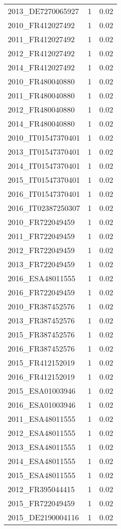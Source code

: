 \begin{table*}[htbp]
\begin{tabular}{lrr}
2013_DE7270065927 & 1 & 0.02 \\
2010_FR412027492 & 1 & 0.02 \\
2011_FR412027492 & 1 & 0.02 \\
2012_FR412027492 & 1 & 0.02 \\
2014_FR412027492 & 1 & 0.02 \\
2010_FR480040880 & 1 & 0.02 \\
2011_FR480040880 & 1 & 0.02 \\
2012_FR480040880 & 1 & 0.02 \\
2014_FR480040880 & 1 & 0.02 \\
2010_IT01547370401 & 1 & 0.02 \\
2013_IT01547370401 & 1 & 0.02 \\
2014_IT01547370401 & 1 & 0.02 \\
2015_IT01547370401 & 1 & 0.02 \\
2016_IT01547370401 & 1 & 0.02 \\
2016_IT02387250307 & 1 & 0.02 \\
2010_FR722049459 & 1 & 0.02 \\
2011_FR722049459 & 1 & 0.02 \\
2012_FR722049459 & 1 & 0.02 \\
2013_FR722049459 & 1 & 0.02 \\
2016_ESA48011555 & 1 & 0.02 \\
2016_FR722049459 & 1 & 0.02 \\
2010_FR387452576 & 1 & 0.02 \\
2013_FR387452576 & 1 & 0.02 \\
2015_FR387452576 & 1 & 0.02 \\
2016_FR387452576 & 1 & 0.02 \\
2015_FR412152019 & 1 & 0.02 \\
2016_FR412152019 & 1 & 0.02 \\
2015_ESA01003946 & 1 & 0.02 \\
2016_ESA01003946 & 1 & 0.02 \\
2011_ESA48011555 & 1 & 0.02 \\
2012_ESA48011555 & 1 & 0.02 \\
2013_ESA48011555 & 1 & 0.02 \\
2014_ESA48011555 & 1 & 0.02 \\
2015_ESA48011555 & 1 & 0.02 \\
2012_FR395044415 & 1 & 0.02 \\
2015_FR722049459 & 1 & 0.02 \\
2015_DE2190004116 & 1 & 0.02 \\

\end{tabular}
\end{table*}
